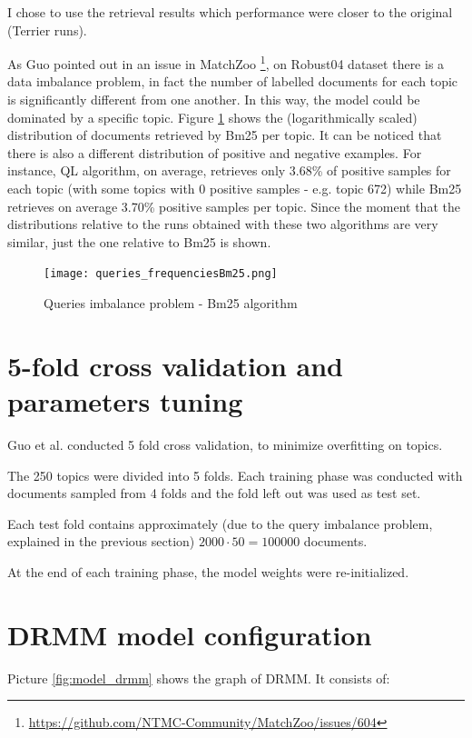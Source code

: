 I chose to use the retrieval results which performance were closer to the original (Terrier runs).

As Guo pointed out in an issue in MatchZoo \footnote{\url{https://github.com/NTMC-Community/MatchZoo/issues/604}}, on Robust04 dataset there is a data imbalance problem, in fact the number of labelled documents for each topic is significantly different from one another.
In this way, the model could be dominated by a specific topic.
Figure \ref{fig:queries_frequencies_bm} shows the (logarithmically scaled) distribution of documents retrieved by Bm25 per topic. It can be noticed that there is also a different distribution of positive and negative examples.
For instance, QL algorithm, on average, retrieves only 3.68\% of positive samples for each topic (with some topics with 0 positive samples - e.g. topic 672) while Bm25 retrieves on average 3.70\% positive samples per topic.
Since the moment that the distributions relative to the runs obtained with these two algorithms are very similar, just the one relative to Bm25 is shown.

\begin{figure}[H]
  \centering
  \texttt{[image: queries\_frequenciesBm25.png]}
  \caption{Queries imbalance problem - Bm25 algorithm}
  \label{fig:queries_frequencies_bm}
\end{figure}

\section{5-fold cross validation and parameters tuning}

Guo et al. conducted 5 fold cross validation, to minimize overfitting on topics.

The 250 topics were divided into 5 folds. Each training phase was conducted with documents sampled from 4 folds and the fold left out was used as test set.

Each test fold contains approximately (due to the query imbalance problem, explained in the previous section) $2000 \cdot 50 = 100000$ documents.

At the end of each training phase, the model weights were re-initialized.

\section{DRMM model configuration}

Picture \ref{fig:model_drmm} shows the graph of DRMM. It consists of:

